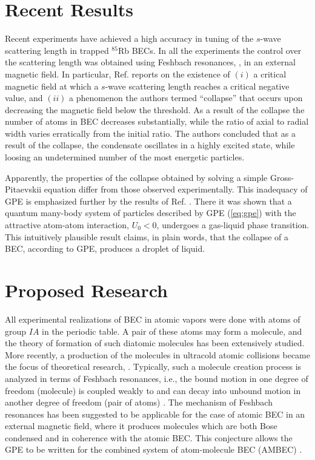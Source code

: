 \documentclass[%
   final       %
]{prospectus}
\begin{document}
\section*{Recent Results}


Recent experiments \cite{Robertsetal2001,Robertsetal2001B,Cornishetal2000}
have achieved a high accuracy in tuning of the $s$-wave scattering
length in trapped
$^{85}$Rb BECs. In all the experiments the control over the scattering length
was obtained using Feshbach resonances, \cite{Feshbach1950,Child1974},
in an external magnetic field. In
particular, Ref. \cite{Robertsetal2001B} reports on the existence of
$(i)$ a critical magnetic field at which a $s$-wave scattering length 
reaches a critical negative value, and $(ii)$ a phenomenon the authors termed
``collapse'' that occurs upon decreasing the magnetic field below the 
threshold. As a result of the collapse the number of atoms in BEC decreases
substantially, while the ratio of axial to radial width varies erratically
from the initial ratio.
The authors
concluded that as a result of the collapse, the condensate oscillates in a
highly excited state, while loosing an undetermined number of the most
energetic particles.

Apparently, the properties of the collapse obtained by solving a simple
Gross-Pitaevskii equation differ from those observed
experimentally. This inadequacy of GPE is emphasized further by the
results of Ref. \cite{glc}. There it was shown that a quantum 
many-body system of particles described
by GPE (\ref{eq:gpe}) with the attractive atom-atom interaction, $U_0 < 0$,
undergoes a gas-liquid phase transition. This intuitively plausible result
claims, in plain words, that the collapse of a BEC, according to GPE,
produces a droplet of liquid.

\section*{Proposed Research}

All experimental realizations of BEC in atomic vapors were done with
atoms of group $IA$ in the periodic table.  A pair of these atoms may form a
molecule, and the theory of formation of such diatomic molecules has been
extensively studied. 
More recently, a production of the molecules in ultracold atomic collisions 
became the focus of theoretical research, 
\cite{Tiesingaetal1993,Moerdijketal1995}. 
Typically, such a molecule creation process is analyzed in
terms of Feshbach resonances, i.e., the bound motion in one
degree of freedom (molecule) is coupled weakly to and can decay into unbound
motion in another degree of freedom (pair of atoms) 
\cite{friedrich94:feshbach}. 
The mechanism of Feshbach resonances has been suggested to be applicable
for the case of atomic BEC in an external magnetic field, where it produces
molecules which are both
Bose condensed and in coherence with the atomic BEC. This conjecture allows
the GPE to be written for the combined system of atom-molecule BEC
(AMBEC) \cite{Timmermansetal1999}.
\end{document}
